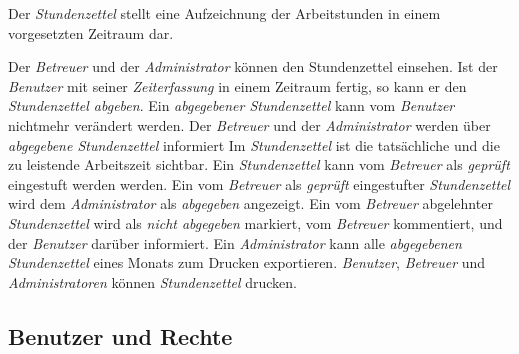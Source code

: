 \begin{requirements}
    Der \emph{Stundenzettel} stellt eine Aufzeichnung der Arbeitstunden in einem vorgesetzten Zeitraum dar.
    \begin{requirements}
         Der \emph{Betreuer} und der \emph{Administrator} können den Stundenzettel einsehen.
         Ist der \emph{Benutzer} mit seiner \emph{Zeiterfassung} in einem Zeitraum fertig, so kann er den \emph{Stundenzettel abgeben}.
         Ein \emph{abgegebener Stundenzettel} kann vom \emph{Benutzer} nichtmehr verändert werden.
         Der \emph{Betreuer} und der \emph{Administrator} werden über \emph{abgegebene Stundenzettel} informiert
         Im \emph{Stundenzettel} ist die tatsächliche und die zu leistende Arbeitszeit sichtbar.
         Ein \emph{Stundenzettel} kann vom \emph{Betreuer} als \emph{geprüft} eingestuft werden werden.
         Ein vom \emph{Betreuer} als \emph{geprüft} eingestufter \emph{Stundenzettel} wird dem \emph{Administrator} als \emph{abgegeben} angezeigt.
         Ein vom \emph{Betreuer} abgelehnter \emph{Stundenzettel} wird als \emph{nicht abgegeben} markiert, vom \emph{Betreuer} kommentiert, und der \emph{Benutzer} darüber informiert.
         Ein \emph{Administrator} kann alle \emph{abgegebenen Stundenzettel} eines Monats zum Drucken exportieren.
        \emph{Benutzer}, \emph{Betreuer} und \emph{Administratoren} können \emph{Stundenzettel} drucken.
    \end{requirements}

\end{requirements}

\subsection{Benutzer und Rechte}

